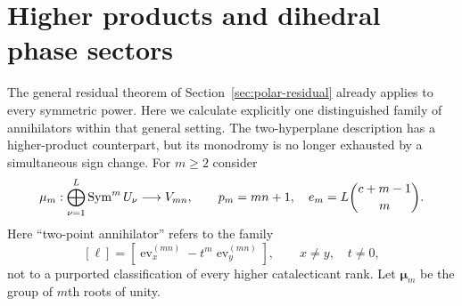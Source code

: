 \section{Higher products and dihedral phase sectors}\label{sec:higher-products}
The general residual theorem of Section~\ref{sec:polar-residual}
already applies to every symmetric power. Here we calculate explicitly
one distinguished family of annihilators within that general setting.
The two-hyperplane description has a higher-product counterpart, but
its monodromy is no longer exhausted by a simultaneous sign change.
For $m\ge2$ consider
\[
 \mu_m:\bigoplus_{\nu=1}^L\operatorname{Sym}^mU_\nu\longrightarrow V_{mn},
 \qquad p_m=mn+1,\quad e_m=L\binom{c+m-1}{m}.
\]
Here ``two-point annihilator'' refers to the family
\[
 [\ell]=[\operatorname{ev}_x^{(mn)}-t^m\operatorname{ev}_y^{(mn)}],
 \qquad x\ne y,\quad t\ne0,
\]
not to a purported classification of every higher catalecticant rank.
Let $\boldsymbol\mu_m$ be the group of $m$th roots of unity.

